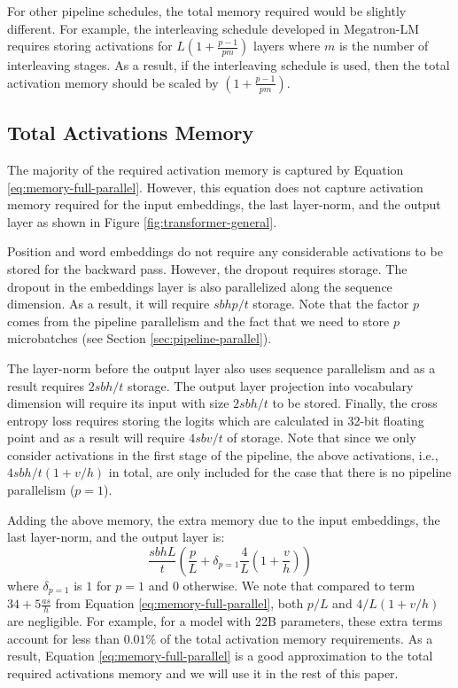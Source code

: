 \documentclass{article}
\begin{document}
For other pipeline schedules, the total memory required would be slightly different. For example, the interleaving schedule developed in Megatron-LM~\cite{megatron-pipeline} requires storing activations for $L(1+\frac{p-1}{pm})$ layers where $m$ is the number of interleaving stages. As a result, if the interleaving schedule is used, then the total activation memory should be scaled by $(1+\frac{p-1}{pm})$.


\subsection{Total Activations Memory}
\label{sec:total-act-mem}

The majority of the required activation memory is captured by Equation \ref{eq:memory-full-parallel}. However, this equation does not capture activation memory required for the input embeddings, the last layer-norm, and the output layer as shown in Figure \ref{fig:transformer-general}.

Position and word embeddings do not require any considerable activations to be stored for the backward pass. However, the dropout requires storage. The dropout in the embeddings layer is also parallelized along the sequence dimension. As a result, it will require $sbhp/t$ storage. Note that the factor $p$ comes from the pipeline parallelism and the fact that we need to store $p$ microbatches (see Section \ref{sec:pipeline-parallel}).

The layer-norm before the output layer also uses sequence parallelism and as a result requires $2sbh/t$ storage. The output layer projection into vocabulary dimension will require its input with size $2sbh/t$ to be stored. Finally, the cross entropy loss requires storing the logits which are calculated in 32-bit floating point and as a result will require $4sbv/t$ of storage. Note that since we only consider activations in the first stage of the pipeline, the above activations, i.e., $4sbh/t(1+v/h)$ in total, are only included for the case that there is no pipeline parallelism ($p=1$).

Adding the above memory, the extra memory due to the input embeddings, the last layer-norm, and the output layer is:
\begin{equation*}
     \frac{sbhL}{t} \left(\frac{p}{L} + \delta_{p=1}\frac{4}{L}\left(1+\frac{v}{h}\right)\right)
    \label{eq:memory-full-parallel-with-first-last}
\end{equation*}
where $\delta_{p=1}$ is $1$ for $p=1$ and $0$ otherwise. We note that compared to term $34+5\frac{as}{h}$ from Equation \ref{eq:memory-full-parallel}, both $p/L$ and $4/L(1+v/h)$ are negligible. For example, for a model with 22B parameters, these extra terms account for less than $0.01\%$ of the total activation memory requirements. As a result, Equation \ref{eq:memory-full-parallel} is a good approximation to the total required activations memory and we will use it in the rest of this paper.
\end{document}
